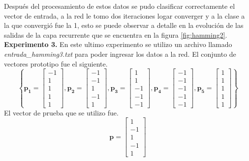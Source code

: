 \documentclass[12pt, titlepage]{article}
\begin{document}
    Después del procesamiento de estos datos se pudo clasificar correctamente el vector de entrada, a la red le tomo dos iteraciones logar converger y a la clase a la que convergió fue la 1, esto se puede observar a detalle en la evolución de las salidas de la capa recurrente que se encuentra en la figura \ref{fig:hamming2}.
    \newline
    \textbf{Experimento 3.} En este ultimo experimento se utilizo un archivo llamado \emph{entrada\_hamming3.txt} para poder ingresar los datos a la red. El conjunto de vectores prototipo fue el siguiente.
    \[ \left\lbrace \boldsymbol{p_1} = \left[\begin{array}{c}-1\\ 1\\ 1 \\ 1 \\ 1 \end{array}\right], \boldsymbol{p_2} = \left[\begin{array}{c}-1\\ -1\\ 1 \\ -1 \\ 1 \end{array}\right], \boldsymbol{p_3} = \left[\begin{array}{c}1\\ 1\\ -1 \\ -1 \\ -1 \end{array}\right], \boldsymbol{p_4} = \left[\begin{array}{c}-1\\ -1\\ -1 \\ -1 \\ -1 \end{array}\right], \boldsymbol{p_5} = \left[\begin{array}{c}1\\ 1\\ 1 \\ 1 \\ 1 \end{array}\right] \right\rbrace \]
    El vector de prueba que se utilizo fue.
    \[ \boldsymbol{p} = \left[\begin{array}{c}1\\ -1\\ 1 \\ -1 \\ 1\end{array}\right] \]
\end{document}
